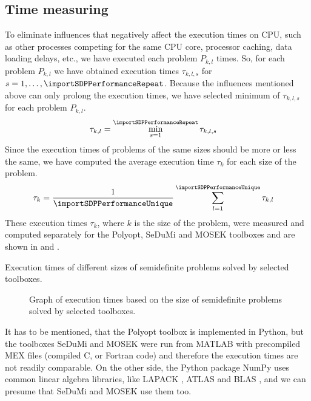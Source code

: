 \subsection{Time measuring}
To eliminate influences that negatively affect the execution times on CPU, such as other processes competing for the same CPU core, processor caching, data loading delays, etc., we have executed each problem $P_{k,l}$ \importSDPPerformanceRepeat{} times.
So, for each problem $P_{k,l}$ we have obtained execution times $\tau_{k,l,s}$ for $s = 1,\ldots,\importSDPPerformanceRepeat$.
Because the influences mentioned above can only prolong the execution times, we have selected minimum of $\tau_{k,l,s}$ for each problem $P_{k,l}$.
\begin{align}
  \tau_{k,l} &= \min_{s=1}^{\importSDPPerformanceRepeat} \tau_{k,l,s}
\end{align}
Since the execution times of problems of the same sizes should be more or less the same, we have computed the average execution time $\tau_k$ for each size of the problem.
\begin{align}
  \tau_k &= \frac{1}{\importSDPPerformanceUnique}\sum_{l=1}^{\importSDPPerformanceUnique} \tau_{k,l}
\end{align}
These execution times $\tau_k$, where $k$ is the size of the problem, were measured and computed separately for the Polyopt, SeDuMi and MOSEK toolboxes and are shown in  and .

\begin{table}[ht]
  \centering
  
  \caption{Execution times of different sizes of semidefinite problems solved by selected toolboxes.}
\end{table}

\begin{figure}[ht]
  \centering
  \resizebox{0.95\textwidth}{!}{}
  \caption{Graph of execution times based on the size of semidefinite problems solved by selected toolboxes.}
\end{figure}

It has to be mentioned, that the Polyopt toolbox is implemented in Python, but the toolboxes SeDuMi and MOSEK were run from MATLAB with precompiled MEX files (compiled C, \CC{} or Fortran code) and therefore the execution times are not readily comparable.
On the other side, the Python package NumPy uses common linear algebra libraries, like LAPACK \cite{lapack}, ATLAS \cite{atlas} and BLAS \cite{blas}, and we can presume that SeDuMi and MOSEK use them too.

